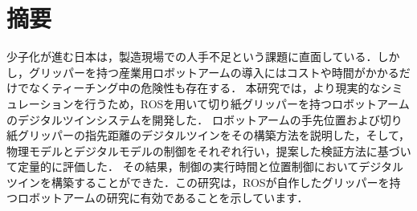 \section*{%
摘要}

少子化が進む日本は，製造現場での人手不足という課題に直面している．しかし，グリッパーを持つ産業用ロボットアームの導入にはコストや時間がかかるだけでなくティーチング中の危険性も存在する．
本研究では，より現実的なシミュレーションを行うため，ROSを用いて切り紙グリッパーを持つロボットアームのデジタルツインシステムを開発した．
ロボットアームの手先位置および切り紙グリッパーの指先距離のデジタルツインをその構築方法を説明した，そして，物理モデルとデジタルモデルの制御をそれぞれ行い，提案した検証方法に基づいて定量的に評価した．
その結果，制御の実行時間と位置制御においてデジタルツインを構築することができた．この研究は，ROSが自作したグリッパーを持つロボットアームの研究に有効であることを示しています．